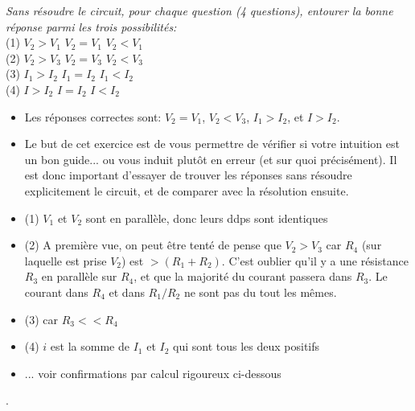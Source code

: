{
\textit{Sans résoudre le circuit, pour chaque question (4 questions), entourer la bonne réponse parmi les trois possibilités:}\\
(1) \hspace{1cm} $V_2 > V_1$ \hspace{1cm}  $V_2 = V_1$ \hspace{1cm} $V_2 < V_1$\\
(2) \hspace{1cm} $V_2 > V_3$ \hspace{1cm}  $V_2 = V_3$ \hspace{1cm} $V_2 < V_3$\\
(3) \hspace{1cm}  $I_1 > I_2$ \hspace{1.25cm}  $I_1 = I_2$ \hspace{1.25cm} $I_1 < I_2$\\
(4) \hspace{1cm} $I > I_2$ \hspace{1.4cm}  $I = I_2$ \hspace{1.4cm} $I < I_2$\\
}
{%
\begin{itemize}
\item Les réponses correctes sont: \textbf{$V_2 = V_1$},
\textbf{$V_2 < V_3$}, \textbf{$I_1 > I_2$}, et
\textbf{$I > I_2$}.

\item Le but de cet exercice est de vous permettre de vérifier si votre intuition est un bon guide... ou vous induit plutôt en erreur (et sur quoi précisément). Il est donc important d'essayer de trouver les réponses sans résoudre explicitement le circuit, et de comparer avec la résolution ensuite.
\item (1) $V_1$ et $V_2$ sont en parallèle, donc leurs ddps sont identiques
\item (2) A première vue, on peut être tenté de pense que $V_2>V_3$ car $R_4$ (sur laquelle est prise $V_2$) est $>(R_1+R_2)$. C'est oublier qu'il y a une résistance $R_3$ en parallèle sur $R_4$, et que la majorité du courant passera dans $R_3$. Le courant dans $R_4$ et dans $R_1/R_2$ ne sont pas du tout les mêmes.
\item (3) car $R_3<<R_4$
\item (4) $i$ est la somme de $I_1$ et $I_2$ qui sont tous les deux positifs
\item ... voir confirmations par calcul rigoureux ci-dessous
\end{itemize}
.
}


